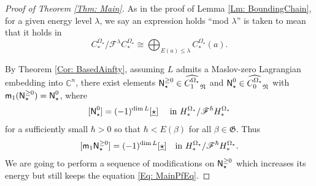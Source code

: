 \documentclass[10pt]{amsart}
\numberwithin{equation}{section}
\theoremstyle{plain}
\theoremstyle{definition}
\theoremstyle{remark}
\numberwithin{equation}{section}
\newcommand{\C}{\mathbb{C}}
\newcommand{\wh}[1]{\widehat{#1}}
\newcommand{\mf}[1]{\mathfrak{#1}}
\newcommand{\ms}[1]{\mathscr{#1}}
\newcommand{\CBa}{C_*^{\Omega_\star}}
\newcommand{\HBa}{H_*^{\Omega_\star}}
\newcommand{\Cba}[1]{C_{#1}^{\Omega_\star}}
\newcommand{\mm}{\textup{\textsf{m}}}
\newcommand{\NNN}{\textup{\textsf{N}}_\star}
\begin{document}
{\begin{proof}
	[Proof of Theorem \ref{Thm: Main}]	
	As in the proof of Lemma \ref{Lm: BoundingChain}, for a given energy level $\lambda$, we say an expression holds ``mod $\lambda$'' is taken to mean that it holds in \[\CBa/\ms{F}^{\lambda}\CBa\cong \bigoplus_{E(a)\leq \lambda} \CBa(a).\]

	
	By Theorem \ref{Cor: BasedAinfty}, assuming $L$ admits a Maslov-zero Lagrangian embedding into $\C^n$,  there exist elements $\NNN^{\geq 0}\in \wh{\Cba{1}}_\mf{N}$ and $\NNN^0\in \wh{\Cba{0}}_\mf{N}$ with $\mm_1(\NNN^{\geq 0}) = \NNN^0$, where 
	\[
	[\NNN^0] = (-1)^{\dim L} [\underline{\star}]\quad \textup{ in }\HBa/\ms{F}^\hbar \HBa
	\]
	for a sufficiently small $\hbar>0$ so that $\hbar < E(\beta)$ for all $\beta \in \mf{G}$. Thus
	\begin{equation}
		\label{Eq: MainPfEq}
		[\mm_1\NNN^{\geq 0}] = (-1)^{\dim L} [\underline{\star}] \quad \textup{in } \HBa/\ms{F}^\hbar\HBa.
	\end{equation} 
	We are going to perform a sequence of modifications on $\NNN^{\geq 0}$ which increases its energy but still keeps the equation \eqref{Eq: MainPfEq}.

	
	
	



\end{proof}}
\end{document}
